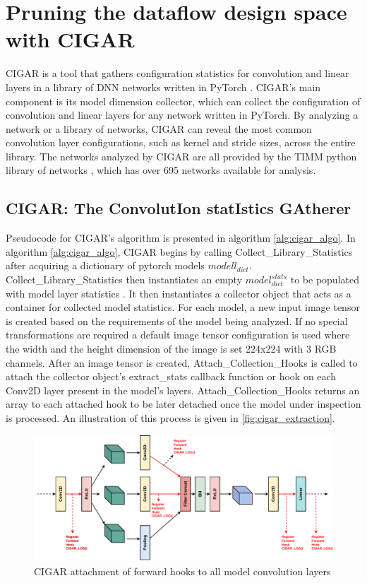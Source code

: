 \section{Pruning the dataflow design space with CIGAR}
\label{chap:dda:dataflow_dse:pruning}

\ac{CIGAR} is a tool that gathers configuration statistics for convolution and
linear layers in a library of DNN networks written in PyTorch \cite{pytorch}.
CIGAR's main component is its model dimension collector, which can collect the
configuration of convolution and linear layers for any network written in
PyTorch. By analyzing a network or a library of networks, CIGAR can reveal the
most common convolution layer configurations, such as kernel and stride sizes,
across the entire library. The networks analyzed by CIGAR are all provided by
the \ac{TIMM} python library of networks \cite{timm}, which has over 695
networks available for analysis.

\subsection{CIGAR: The ConvolutIon statIstics GAtherer}
\label{chap:dda:dataflow_dse:pruning:cigar}

Pseudocode for \ac{CIGAR}'s algorithm is presented in algorithm
\ref{alg:cigar_algo}. In algorithm \ref{alg:cigar_algo}, \ac{CIGAR} begins by
calling Collect\_Library\_Statistics after acquiring a dictionary of pytorch
models $modell_{dict}$. Collect\_Library\_Statistics then instantiates an empty
$model^{stats}_{dict}$ to be populated with model layer statistics . It then
instantiates a collector object that acts as a container for collected model
statistics. For each model, a new input image tensor is created based on the
requirements of the model being analyzed. If no special transformations are
required a default image tensor configuration is used where the width and the
height dimension of the image is set 224x224 with 3 RGB channels. After an image
tensor is created, Attach\_Collection\_Hooks is called to attach the collector
object's extract\_stats callback function or hook on each Conv2D layer present
in the model's layers. Attach\_Collection\_Hooks returns an array to each
attached hook to be later detached once the model under inspection is processed.
An illustration of this process is given in \autoref{fig:cigar_extraction}.

\begin{figure}
    \centering
    \includegraphics[scale=0.5]{fig/CIGAR.pdf}
    \caption{\ac{CIGAR} attachment of forward hooks to all model convolution layers}
    \label{fig:cigar_extraction}
\end{figure}


